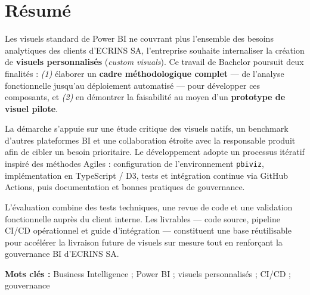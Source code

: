 \chapter*{Résumé}
\setlength{\parindent}{0pt}

\noindent
Les visuels standard de Power BI ne couvrant plus l’ensemble des besoins analytiques des clients d’ECRINS SA, l’entreprise souhaite internaliser la création de \textbf{visuels personnalisés} (\emph{custom visuals}).  
Ce travail de Bachelor poursuit deux finalités : \textit{(1)} élaborer un \textbf{cadre méthodologique complet} — de l’analyse fonctionnelle jusqu’au déploiement automatisé — pour développer ces composants, et \textit{(2)} en démontrer la faisabilité au moyen d’un \textbf{prototype de visuel pilote}.

La démarche s’appuie sur une étude critique des visuels natifs, un benchmark d’autres plateformes BI et une collaboration étroite avec la responsable produit afin de cibler un besoin prioritaire.  
Le développement adopte un processus itératif inspiré des méthodes Agiles : configuration de l’environnement \texttt{pbiviz}, implémentation en TypeScript / D3, tests et intégration continue via GitHub Actions, puis documentation et bonnes pratiques de gouvernance.

L’évaluation combine des tests techniques, une revue de code et une validation fonctionnelle auprès du client interne.  
Les livrables — code source, pipeline CI/CD opérationnel et guide d’intégration — constituent une base réutilisable pour accélérer la livraison future de visuels sur mesure tout en renforçant la gouvernance BI d’ECRINS SA.

\vspace{0.8em}
\noindent\textbf{Mots clés :} Business Intelligence ; Power BI ; visuels personnalisés ; CI/CD ; gouvernance

